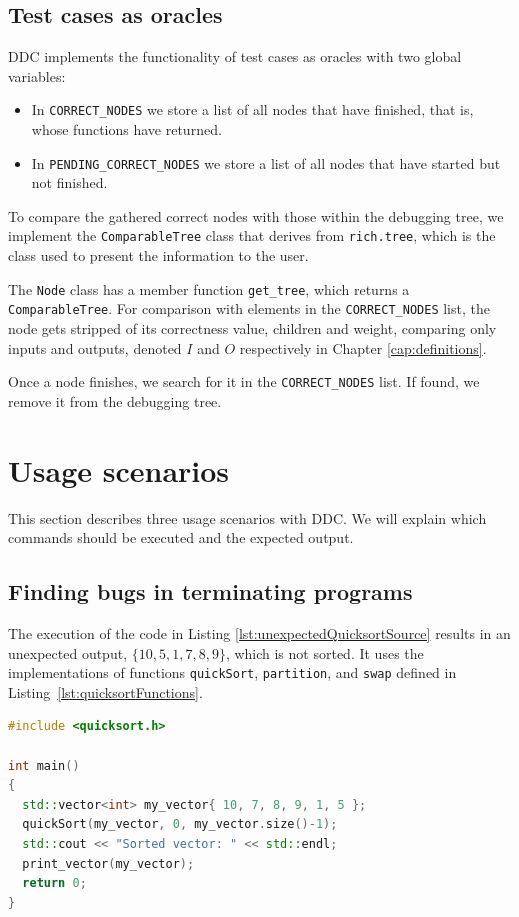 \subsection{Test cases as oracles}
DDC implements the functionality of test cases as oracles with two global variables:

\begin{itemize}
    \item In \verb|CORRECT_NODES| we store a list of all nodes that have finished, that is, whose functions have returned.
    \item In \verb|PENDING_CORRECT_NODES| we store a list of all nodes that have started but not finished.
\end{itemize}

To compare the gathered correct nodes with those within the debugging tree, we implement the \verb|ComparableTree| class that derives from \verb|rich.tree|, which is the class used to present the information to the user. 

The \verb|Node| class has a member function \verb|get_tree|, which returns a \verb|ComparableTree|.
For comparison with elements in the \verb|CORRECT_NODES| list, the node gets stripped of its correctness value, children and weight, comparing only inputs and outputs, denoted \(I\) and \(O\) respectively in Chapter \ref{cap:definitions}.

Once a node finishes, we search for it in the \verb|CORRECT_NODES| list. If found, we remove it from the debugging tree.

\section{Usage scenarios}
This section describes three usage scenarios with DDC.
We will explain which commands should be executed and the expected output.

\subsection{Finding bugs in terminating programs}
The execution of the code in Listing \ref{lst:unexpectedQuicksortSource} results in an unexpected output, \(\{10, 5, 1, 7, 8, 9\}\), which is not sorted.
It uses the implementations of functions \verb|quickSort|, \verb|partition|, and \verb|swap| defined in Listing~\ref{lst:quicksortFunctions}.
\begin{lstlisting}[language=C++, caption={Code that results in unexpected output}, frame=tb, label={lst:unexpectedQuicksortSource}]
#include <quicksort.h>

int main()
{
  std::vector<int> my_vector{ 10, 7, 8, 9, 1, 5 };
  quickSort(my_vector, 0, my_vector.size()-1);
  std::cout << "Sorted vector: " << std::endl;
  print_vector(my_vector);
  return 0;
}
\end{lstlisting}

